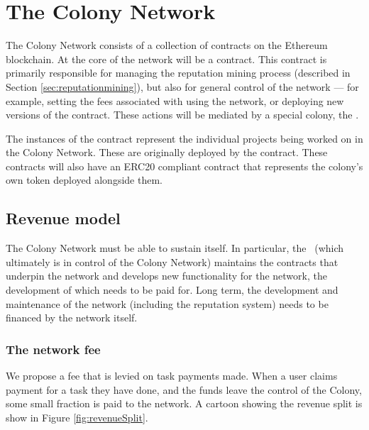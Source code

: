 \section{The Colony Network}\label{sec:colonynetwork}

The Colony Network consists of a collection of contracts on the Ethereum blockchain. At the core of the network will be a  contract. This contract is primarily responsible for managing the reputation mining process (described in Section \ref{sec:reputationmining}), but also for general control of the network --- for example, setting the fees associated with using the network, or deploying new versions of the  contract. These actions will be mediated by a special colony, the \rc.

The instances of the  contract represent the individual projects being worked on in the Colony Network. These are originally deployed by the  contract. These  contracts will also have an ERC20 compliant contract that represents the colony's own token deployed alongside them.

\subsection{Revenue model}\label{sec:networkrevenue}
The Colony Network must be able to sustain itself. In particular, the \rc\ (which ultimately is in control of the Colony Network) maintains the contracts that underpin the network and develops new functionality for the network, the development of which needs to be paid for. Long term, the development and maintenance of the network (including the reputation system) needs to be financed by the network itself.

\subsubsection{The network fee}\label{sec:networkfee}
We propose a fee that is levied on task payments made. When a user claims payment for a task they have done, and the funds leave the control of the Colony, some small fraction is paid to the network. A cartoon showing the revenue split is show in Figure \ref{fig:revenueSplit}.

